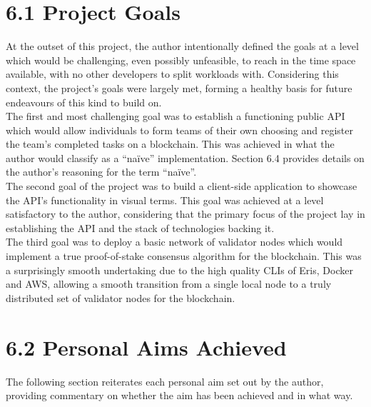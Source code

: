 \section{6.1 Project Goals}\label{project-goals-1}

At the outset of this project, the author intentionally defined the
goals at a level which would be challenging, even possibly unfeasible,
to reach in the time space available, with no other developers to split
workloads with. Considering this context, the project's goals were
largely met, forming a healthy basis for future endeavours of this kind
to build on.\\
The first and most challenging goal was to establish a functioning
public API which would allow individuals to form teams of their own
choosing and register the team's completed tasks on a blockchain. This
was achieved in what the author would classify as a ``naïve''
implementation. Section 6.4 provides details on the author's reasoning
for the term ``naïve''.\\
The second goal of the project was to build a client-side application to
showcase the API's functionality in visual terms. This goal was achieved
at a level satisfactory to the author, considering that the primary
focus of the project lay in establishing the API and the stack of
technologies backing it.\\
The third goal was to deploy a basic network of validator nodes which
would implement a true proof-of-stake consensus algorithm for the
blockchain. This was a surprisingly smooth undertaking due to the high
quality CLIs of Eris, Docker and AWS, allowing a smooth transition from
a single local node to a truly distributed set of validator nodes for
the blockchain.

\section{6.2 Personal Aims Achieved}\label{personal-aims-achieved}

The following section reiterates each personal aim set out by the
author, providing commentary on whether the aim has been achieved and in
what way.

